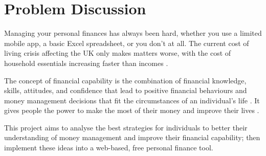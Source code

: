 \section{Problem Discussion}
Managing your personal finances has always been hard, whether you use a limited mobile app, a basic Excel spreadsheet, or you don't at all. The current cost of living crisis affecting the UK only makes matters worse, with the cost of household essentials increasing faster than incomes \cite{hourston_2022}.  

The concept of financial capability is the combination of financial knowledge, skills, attitudes, and confidence that lead to positive financial behaviours and money management decisions that fit the circumstances of an individual's life \cite{FinancialCapabilityAU}. It gives people the power to make the most of their money and improve their lives \cite{FinancialCapabilityUK}.

This project aims to analyse the best strategies for individuals to better their understanding of money management and improve their financial capability; then implement these ideas into a web-based, free personal finance tool.
